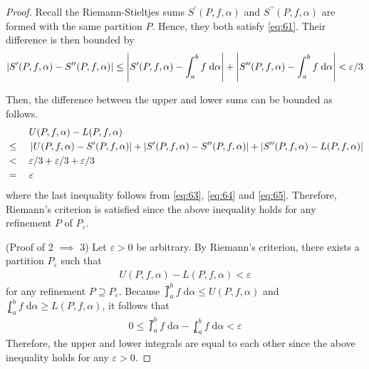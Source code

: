 \documentclass[thmcnt=section, 12pt]{my-elegantbook}
\begin{document}
\begin{proof}
    Recall the Riemann-Stieltjes sums $S^{\prime}(P,f,\alpha)$ and $S^{\prime\prime}(P,f,\alpha)$ are formed with the same partition $P$. Hence, they both satisfy \eqref{eq:61}. Their difference is then bounded by
    \begin{align}
        \left\lvert S^{\prime}(P,f,\alpha) - S^{\prime\prime}(P,f,\alpha) \right\rvert
        \leq \left\lvert S^{\prime}(P,f,\alpha) - \int_{a}^{b} f \; \mathrm{d}\alpha \right\rvert
        + \left\lvert S^{\prime\prime}(P,f,\alpha) - \int_{a}^{b} f \; \mathrm{d}\alpha \right\rvert
        < \varepsilon / 3
        \label{eq:65}
    \end{align}

    Then, the difference between the upper and lower sums can be bounded as follows.
    \begin{alignat*}{2}
         &      & \; & U(P,f,\alpha) - L(P,f,\alpha)                       \\
         & \leq &    & \left\lvert U(P,f,\alpha) - S^\prime(P,f,\alpha) \right\rvert
        + \left\lvert S^\prime(P,f,\alpha) - S^{\prime\prime}(P,f,\alpha) \right\rvert
        + \left\lvert S^{\prime\prime}(P,f,\alpha) - L(P,f,\alpha) \right\rvert               \\
         & <    &    & \varepsilon / 3 + \varepsilon / 3 + \varepsilon / 3 \\
         & =    &    & \varepsilon
    \end{alignat*}
    where the last inequality follows from \eqref{eq:63}, \eqref{eq:64} and \eqref{eq:65}. Therefore, Riemann's criterion is satisfied since the above inequality holds for any refinement $P$ of $P_\varepsilon$.

    (Proof of 2 $\implies$ 3) Let $\varepsilon > 0$ be arbitrary. By Riemann's criterion, there exists a partition $P_\varepsilon$ such that
    \begin{align*}
        U(P,f,\alpha) - L(P,f,\alpha) < \varepsilon
    \end{align*}
    for any refinement $P \supseteq P_\varepsilon$. Because $\upint_a^b f \; \mathrm{d}\alpha \leq U(P,f,\alpha)$ and $\lowint_a^b f \; \mathrm{d}\alpha \geq L(P,f,\alpha)$, it follows that
    \begin{align*}
        0 \leq \upint_a^b f \; \mathrm{d}\alpha - \lowint_a^b f \; \mathrm{d}\alpha
        < \varepsilon
    \end{align*}
    Therefore, the upper and lower integrals are equal to each other since the above inequality holds for any $\varepsilon > 0$.


\end{proof}
\end{document}
